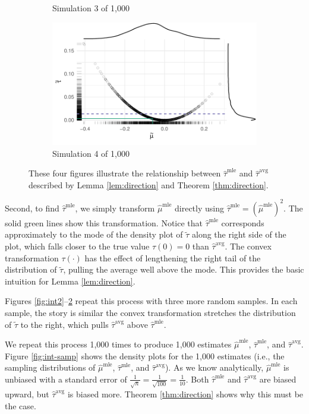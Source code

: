 \documentclass[11pt]{article}
\begin{document}
\begin{figure}
\begin{subfigure}{.5\textwidth}
  \caption{Simulation 3 of 1,000}
  \label{fig:int3}
\end{subfigure}%
\begin{subfigure}{.5\textwidth}
  \centering
  \includegraphics[width=.85\linewidth]{figs/intuition-4.pdf}
  \caption{Simulation 4 of 1,000}
  \label{fig:int4}
\end{subfigure}

\vspace{.1in}
\caption{These four figures illustrate the relationship between $\hat{\tau}^\text{mle}$ and $\hat{\tau}^\text{avg}$ described by Lemma \ref{lem:direction} and Theorem \ref{thm:direction}.}
\label{fig:int}
\end{figure}

Second, to find $\hat{\tau}^\text{mle}$, we simply transform $\hat{\mu}^\text{mle}$ directly using $\hat{\tau}^\text{mle} = \left( \hat{\mu}^\text{mle} \right) ^2$.
The solid green lines show this transformation.
Notice that $\hat{\tau}^\text{mle}$ corresponds approximately to the mode of the density plot of $\tilde{\tau}$ along the right side of the plot, which falls closer to the true value $\tau(0) = 0$ than $\hat{\tau}^\text{avg}$.
The convex transformation $\tau(\cdot)$ has the effect of lengthening the right tail of the distribution of $\tilde{\tau}$, pulling the average well above the mode.
This provides the basic intuition for Lemma \ref{lem:direction}.

Figures \ref{fig:int2}--\ref{fig:int4} repeat this process with three more random samples.
In each sample, the story is similar \textemdash{} the convex transformation stretches the distribution of $\tilde{\tau}$ to the right, which pulls $\hat{\tau}^\text{avg}$ above $\hat{\tau}^\text{mle}$.

We repeat this process 1,000 times to produce 1,000 estimates $\hat{\mu}^\text{mle}$, $\hat{\tau}^\text{mle}$, and $\hat{\tau}^\text{avg}$.
Figure \ref{fig:int-samp} shows the density plots for the 1,000 estimates (i.e., the sampling distributions of $\hat{\mu}^\text{mle}$, $\hat{\tau}^\text{mle}$, and $\hat{\tau}^\text{avg}$).
As we know analytically, $\hat{\mu}^\text{mle}$ is unbiased with a standard error of $\frac{1}{\sqrt{n}} = \frac{1}{\sqrt{100}} = \frac{1}{10}$.
Both $\hat{\tau}^\text{mle}$ and $\hat{\tau}^\text{avg}$ are biased upward, but $\hat{\tau}^\text{avg}$ is biased more.
Theorem \ref{thm:direction} shows why this must be the case.
\end{document}
